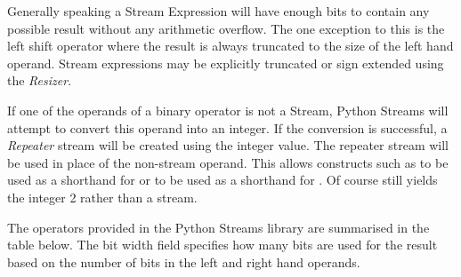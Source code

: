\documentclass[letterpaper,10pt,english]{manual}
\begin{document}
Generally speaking a Stream Expression will have enough bits to contain any
possible result without any arithmetic overflow. The one exception to this is
the left shift operator where the result is always truncated to the size of the
left hand operand. Stream expressions may be explicitly truncated or sign
extended using the \emph{Resizer}.

If one of the operands of a binary operator is not a Stream, Python Streams
will attempt to convert this operand into an integer. If the conversion is
successful, a \emph{Repeater} stream will be created using the integer value. The
repeater stream will be used in place of the non-stream operand. This allows
constructs such as  to be used as a shorthand for  or  to be used as
a shorthand for .  Of course 
still yields the integer 2 rather than a stream.

The operators provided in the Python Streams library are summarised in the
table below. The bit width field specifies how many bits are used for the
result based on the number of bits in the left and right hand operands.
\end{document}
